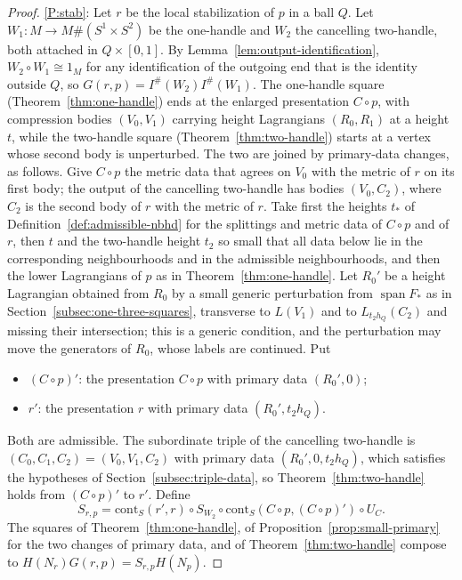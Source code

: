 \documentclass[11pt]{amsart}
\theoremstyle{definition}
\theoremstyle{remark}
\theoremstyle{plain}
\numberwithin{equation}{section}
\newcommand{\Ish}{I^{\#}}
\begin{document}
\begin{proof}
\ref{P:stab}: Let $r$ be the local stabilization of $p$ in a ball $Q$. Let
$W_1\colon M\to M\#(S^1\times S^2)$ be the one-handle and $W_2$ the cancelling
two-handle, both attached in $Q\times[0,1]$. By
Lemma~\ref{lem:output-identification}, $W_2\circ W_1\cong1_M$ for any
identification of the outgoing end that is the identity outside $Q$, so
$G(r,p)=\Ish(W_2)\Ish(W_1)$. The one-handle square
(Theorem~\ref{thm:one-handle}) ends at the enlarged presentation $C\circ p$,
with compression bodies $(V_0,V_1)$ carrying height Lagrangians $(R_0,R_1)$ at a
height $t$, while the two-handle square (Theorem~\ref{thm:two-handle}) starts
at a vertex whose second body is unperturbed. The two are joined by
primary-data changes, as follows. Give $C\circ p$ the metric data that
agrees on $V_0$ with the metric of $r$ on its first body; the output of the
cancelling two-handle has bodies $(V_0,C_2)$, where $C_2$ is the second body of
$r$ with the metric of $r$. Take first the heights $t_*$ of Definition~\ref{def:admissible-nbhd} for the splittings and metric data of
$C\circ p$ and of $r$, then $t$ and the two-handle height $t_2$ so small that
all data below lie in the corresponding neighbourhoods and in the admissible
neighbourhoods, and then the lower Lagrangians of $p$ as in
Theorem~\ref{thm:one-handle}. Let $R_0'$ be a height Lagrangian obtained from $R_0$
by a small generic perturbation from $\operatorname{span}F_*$ as in
Section~\ref{subsec:one-three-squares}, transverse to
$L(V_1)$ and to $L_{t_2h_Q}(C_2)$ and missing their intersection; this is a
generic condition, and the perturbation may move the generators of $R_0$, whose labels are
continued. Put
\begin{itemize}[leftmargin=2em]
\item $(C\circ p)'$: the presentation $C\circ p$ with primary data $(R_0',0)$;
\item $r'$: the presentation $r$ with primary data $(R_0',t_2h_Q)$.
\end{itemize}
Both are admissible. The subordinate triple of the cancelling two-handle is
$(C_0,C_1,C_2)=(V_0,V_1,C_2)$ with primary data $(R_0',0,t_2h_Q)$, which
satisfies the hypotheses of Section~\ref{subsec:triple-data}, so
Theorem~\ref{thm:two-handle} holds from $(C\circ p)'$ to $r'$. Define
\[
S_{r,p}=\mathrm{cont}_S(r',r)\circ S_{W_2}\circ \mathrm{cont}_S(C\circ p,(C\circ p)')\circ U_C .
\]
The squares of Theorem~\ref{thm:one-handle}, of
Proposition~\ref{prop:small-primary} for the two changes of primary data, and of
Theorem~\ref{thm:two-handle} compose to $H(N_r)G(r,p)=S_{r,p}H(N_p)$.


\end{proof}
\end{document}
